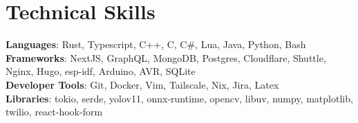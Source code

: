 \documentclass[letterpaper,11pt]{article}
\begin{document}
%
\section{Technical Skills}
 \begin{itemize}[leftmargin=0.15in, label={}]
    \small{\item{
     \textbf{Languages}{: Rust, Typescript, C++, C, C\#, Lua, Java, Python, Bash} \\
     \textbf{Frameworks}{: NextJS, GraphQL, MongoDB, Postgres, Cloudflare, Shuttle, Nginx, Hugo, esp-idf, Arduino, AVR, SQLite} \\
     \textbf{Developer Tools}{: Git, Docker, Vim, Tailscale, Nix, Jira, Latex } \\
     \textbf{Libraries}{: tokio, serde, yolov11, onnx-runtime, opencv, libuv, numpy, matplotlib, twilio, react-hook-form}
    }}
 \end{itemize}


\end{document}

